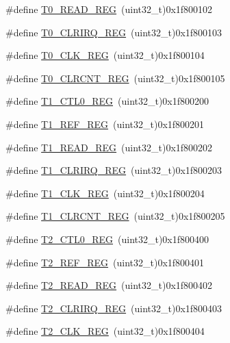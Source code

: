 \begin{DoxyCompactItemize}
\#define \mbox{\hyperlink{a00020_a277152b8a3150eb5ae1201205e2778fb}{T0\+\_\+\+R\+E\+A\+D\+\_\+\+R\+EG}}~(uint32\+\_\+t)0x1f800102
\item 
\#define \mbox{\hyperlink{a00020_aa44a1b05303c294e5a3a178a05b95c40}{T0\+\_\+\+C\+L\+R\+I\+R\+Q\+\_\+\+R\+EG}}~(uint32\+\_\+t)0x1f800103
\item 
\#define \mbox{\hyperlink{a00020_a02a329d71e5fe86e9a0a8513ea5e1630}{T0\+\_\+\+C\+L\+K\+\_\+\+R\+EG}}~(uint32\+\_\+t)0x1f800104
\item 
\#define \mbox{\hyperlink{a00020_a99e5c85746f8520aa6bf8847162cddf5}{T0\+\_\+\+C\+L\+R\+C\+N\+T\+\_\+\+R\+EG}}~(uint32\+\_\+t)0x1f800105
\item 
\#define \mbox{\hyperlink{a00020_a55600694c3c73a1019f78d306f474fa1}{T1\+\_\+\+C\+T\+L0\+\_\+\+R\+EG}}~(uint32\+\_\+t)0x1f800200
\item 
\#define \mbox{\hyperlink{a00020_ad17cf3aaa6ae5443a01b748050e708a1}{T1\+\_\+\+R\+E\+F\+\_\+\+R\+EG}}~(uint32\+\_\+t)0x1f800201
\item 
\#define \mbox{\hyperlink{a00020_ac4d488d7f758fa9852def3acfef02dbe}{T1\+\_\+\+R\+E\+A\+D\+\_\+\+R\+EG}}~(uint32\+\_\+t)0x1f800202
\item 
\#define \mbox{\hyperlink{a00020_a282b05d93f0e94b950d13c1f567dc36d}{T1\+\_\+\+C\+L\+R\+I\+R\+Q\+\_\+\+R\+EG}}~(uint32\+\_\+t)0x1f800203
\item 
\#define \mbox{\hyperlink{a00020_a319b804c31cf3d17dad1df712b0e1a95}{T1\+\_\+\+C\+L\+K\+\_\+\+R\+EG}}~(uint32\+\_\+t)0x1f800204
\item 
\#define \mbox{\hyperlink{a00020_abb2cbf74aac1b5551218b38332137dd9}{T1\+\_\+\+C\+L\+R\+C\+N\+T\+\_\+\+R\+EG}}~(uint32\+\_\+t)0x1f800205
\item 
\#define \mbox{\hyperlink{a00020_a5853553391e986211306d4f29ab31e47}{T2\+\_\+\+C\+T\+L0\+\_\+\+R\+EG}}~(uint32\+\_\+t)0x1f800400
\item 
\#define \mbox{\hyperlink{a00020_afc6a4a26e5276c1e4fe1b3fe26e70984}{T2\+\_\+\+R\+E\+F\+\_\+\+R\+EG}}~(uint32\+\_\+t)0x1f800401
\item 
\#define \mbox{\hyperlink{a00020_ac9b4238c1829d1e3414db560a290e861}{T2\+\_\+\+R\+E\+A\+D\+\_\+\+R\+EG}}~(uint32\+\_\+t)0x1f800402
\item 
\#define \mbox{\hyperlink{a00020_aba8ec9cd37a1487a613cca0194e62f15}{T2\+\_\+\+C\+L\+R\+I\+R\+Q\+\_\+\+R\+EG}}~(uint32\+\_\+t)0x1f800403
\item 
\#define \mbox{\hyperlink{a00020_adaf93e89c438f05ea402aee531c0ac3b}{T2\+\_\+\+C\+L\+K\+\_\+\+R\+EG}}~(uint32\+\_\+t)0x1f800404

\end{DoxyCompactItemize}
